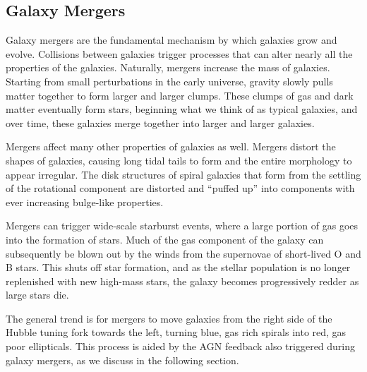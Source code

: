 \subsection{Galaxy Mergers}

Galaxy mergers are the fundamental mechanism by which galaxies grow and evolve.  Collisions between galaxies trigger processes that can alter nearly all the properties of the galaxies.  Naturally, mergers increase the mass of galaxies.  Starting from small perturbations in the early universe, gravity slowly pulls matter together to form larger and larger clumps.  These clumps of gas and dark matter eventually form stars, beginning what we think of as typical galaxies, and over time, these galaxies merge together into larger and larger galaxies.

Mergers affect many other properties of galaxies as well.  Mergers distort the shapes of galaxies, causing long tidal tails to form and the entire morphology to appear irregular.  The disk structures of spiral galaxies that form from the settling of the rotational component are distorted and ``puffed up'' into components with ever increasing bulge-like properties.

Mergers can trigger wide-scale starburst events, where a large portion of gas goes into the formation of stars.  Much of the gas component of the galaxy can subsequently be blown out by the winds from the supernovae of short-lived O and B stars.  This shuts off star formation, and as the stellar population is no longer replenished with new high-mass stars, the galaxy becomes progressively redder as large stars die.

The general trend is for mergers to move galaxies from the right side of the Hubble tuning fork towards the left, turning blue, gas rich spirals into red, gas poor ellipticals.  This process is aided by the AGN feedback also triggered during galaxy mergers, as we discuss in the following section.




